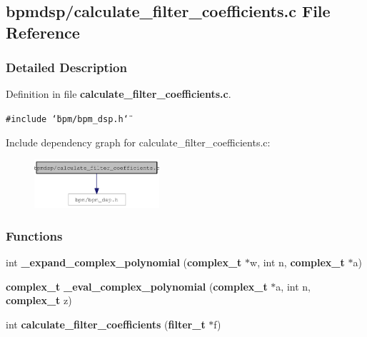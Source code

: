 \subsection{bpmdsp/calculate\_\-filter\_\-coefficients.c File Reference}
\label{calculate__filter__coefficients_8c}


\subsubsection{Detailed Description}


Definition in file {\bf calculate\_\-filter\_\-coefficients.c}.

{\tt \#include \char`\"{}bpm/bpm\_\-dsp.h\char`\"{}}\par


Include dependency graph for calculate\_\-filter\_\-coefficients.c:\nopagebreak
\begin{figure}[H]
\begin{center}
\leavevmode
\includegraphics[width=131pt]{calculate__filter__coefficients_8c__incl}
\end{center}
\end{figure}
\subsubsection*{Functions}
\begin{CompactItemize}
\item 
int {\bf \_\-expand\_\-complex\_\-polynomial} ({\bf complex\_\-t} $\ast$w, int n, {\bf complex\_\-t} $\ast$a)
\item 
{\bf complex\_\-t} {\bf \_\-eval\_\-complex\_\-polynomial} ({\bf complex\_\-t} $\ast$a, int n, {\bf complex\_\-t} z)
\item 
int {\bf calculate\_\-filter\_\-coefficients} ({\bf filter\_\-t} $\ast$f)
\end{CompactItemize}
